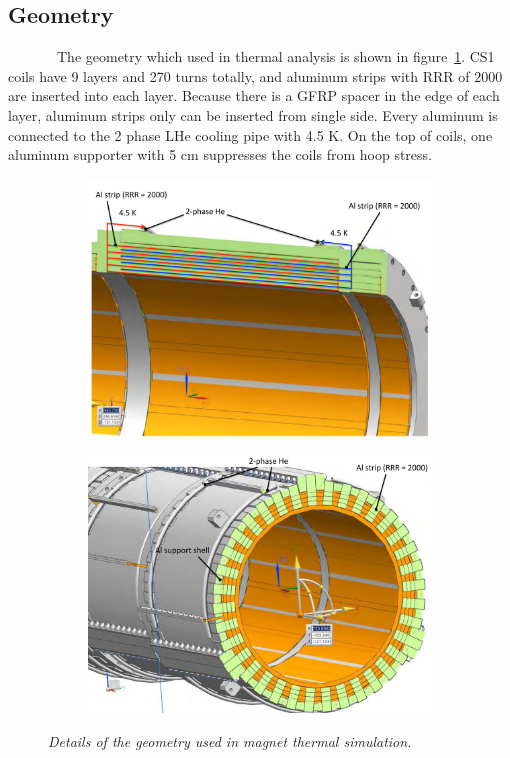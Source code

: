   \subsection{Geometry}
~~~~~~~The geometry which used in thermal analysis is shown in figure~\ref{4geo}.
CS1 coils have 9 layers and 270 turns totally, and aluminum strips with RRR of 2000 are inserted into each layer.
Because there is a GFRP spacer in the edge of each layer, aluminum strips only can be inserted from single side.
Every aluminum is connected to the 2 phase LHe cooling pipe with 4.5 K.
On the top of coils, one aluminum supporter with 5 cm suppresses the coils from hoop stress.
 \begin{figure}[H]
   \begin{subfigure}{0.3\textwidth}
    \centering
    \includegraphics[scale=0.29]{chapter5/fig/geo.pdf}
   \end{subfigure}
   \hspace{0.2\textwidth}
   \begin{subfigure}{0.3\textwidth}
    \centering
	\includegraphics[scale=0.29]{chapter5/fig/geo2.pdf}
   \end{subfigure}
   \caption{\it Details of the geometry used in magnet thermal simulation.}
   \label{4geo}
  \end{figure}
 
